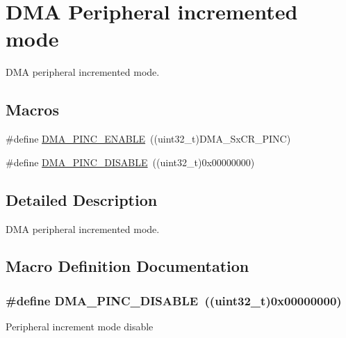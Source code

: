 \hypertarget{group___d_m_a___peripheral__incremented__mode}{}\section{D\+MA Peripheral incremented mode}
\label{group___d_m_a___peripheral__incremented__mode}


D\+MA peripheral incremented mode.  


\subsection*{Macros}
\begin{DoxyCompactItemize}
\item 
\#define \hyperlink{group___d_m_a___peripheral__incremented__mode_gab6d84e5805302516d26c06fb4497a346}{D\+M\+A\+\_\+\+P\+I\+N\+C\+\_\+\+E\+N\+A\+B\+LE}~((uint32\+\_\+t)D\+M\+A\+\_\+\+Sx\+C\+R\+\_\+\+P\+I\+NC)
\item 
\#define \hyperlink{group___d_m_a___peripheral__incremented__mode_ga63e2aff2973d1a8f01d5d7b6e4894f39}{D\+M\+A\+\_\+\+P\+I\+N\+C\+\_\+\+D\+I\+S\+A\+B\+LE}~((uint32\+\_\+t)0x00000000)
\end{DoxyCompactItemize}


\subsection{Detailed Description}
D\+MA peripheral incremented mode. 



\subsection{Macro Definition Documentation}
\subsubsection[{\texorpdfstring{D\+M\+A\+\_\+\+P\+I\+N\+C\+\_\+\+D\+I\+S\+A\+B\+LE}{DMA_PINC_DISABLE}}]{\setlength{\rightskip}{0pt plus 5cm}\#define D\+M\+A\+\_\+\+P\+I\+N\+C\+\_\+\+D\+I\+S\+A\+B\+LE~((uint32\+\_\+t)0x00000000)}\hypertarget{group___d_m_a___peripheral__incremented__mode_ga63e2aff2973d1a8f01d5d7b6e4894f39}{}\label{group___d_m_a___peripheral__incremented__mode_ga63e2aff2973d1a8f01d5d7b6e4894f39}
Peripheral increment mode disable 
